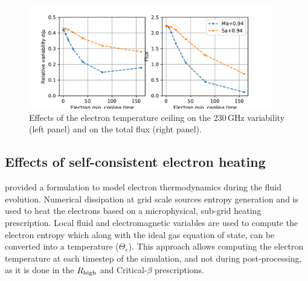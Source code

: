 \begin{figure}
\centering
\includegraphics[width=0.95\textwidth]{figures/ctcut_effects.pdf}
\caption{Effects of the electron temperature ceiling on the 230\,GHz variability (left panel) and on the total flux (right panel).}
\label{fig:ceiling_lc2}
\end{figure}





\subsection{Effects of self-consistent electron heating}


\citealt{10.1093/mnras/stv2084} provided a formulation to model electron thermodynamics during the fluid evolution. Numerical dissipation at grid scale sources entropy generation and is used to heat the electrons based on a microphysical, sub-grid heating prescription. Local fluid and electromagnetic variables are used to compute the electron entropy which along with the ideal gas equation of state, can be converted into a temperature ($\Theta_{e}$). This approach allows computing the electron temperature at each timestep of the simulation, and not during post-processing, as it is done in the $R_\mathrm{high}$ and Critical-$\beta$ prescriptions.

